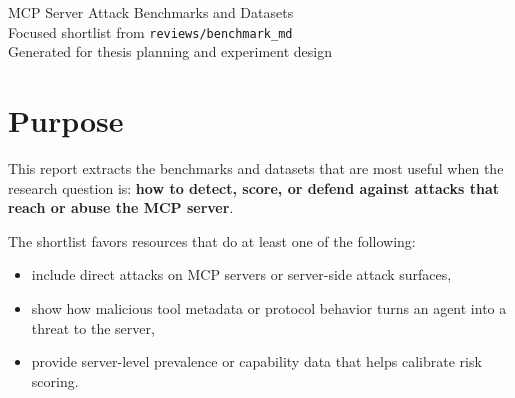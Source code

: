 \documentclass[11pt]{article}
\begin{document}
\begin{center}
{\LARGE MCP Server Attack Benchmarks and Datasets} \\
\vspace{0.4em}
{\large Focused shortlist from \texttt{reviews/benchmark\_md}} \\
\vspace{0.4em}
Generated for thesis planning and experiment design
\end{center}

\section*{Purpose}
This report extracts the benchmarks and datasets that are most useful when the research question is:
\textbf{how to detect, score, or defend against attacks that reach or abuse the MCP server}.

The shortlist favors resources that do at least one of the following:
\begin{itemize}[leftmargin=1.2em]
\item include direct attacks on MCP servers or server-side attack surfaces,
\item show how malicious tool metadata or protocol behavior turns an agent into a threat to the server,
\item provide server-level prevalence or capability data that helps calibrate risk scoring.
\end{itemize}
\end{document}

